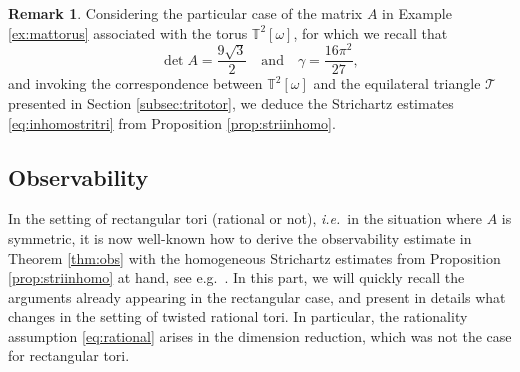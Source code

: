 \documentclass[a4paper,11pt]{amsart}
\numberwithin{equation}{section}
\theoremstyle{definition}
\newtheorem{rk}[thm]{Remark}
\begin{document}
\begin{rk}\label{rk:striinhomo} 
Considering the particular case of the matrix $A$ in Example \ref{ex:mattorus} associated with the torus $\mathbb T^2[\omega]$, for which we recall that 
\[
	\det A = \frac{9\sqrt{3}}{2}\quad\text{and}\quad \gamma = \frac{16\pi^2}{27},
\]
and invoking the correspondence between $\mathbb T^2[\omega]$ and the equilateral triangle $\mathcal T$ presented in Section \ref{subsec:tritotor}, we deduce the Strichartz estimates \eqref{eq:inhomostritri} from Proposition \ref{prop:striinhomo}.
\end{rk}

\subsection{Observability}

In the setting of rectangular tori (rational or not), \textit{i.e.}~in the situation where $A$ is symmetric, it is now well-known how to derive the observability estimate in Theorem \ref{thm:obs} with the homogeneous Strichartz estimates from Proposition \ref{prop:striinhomo} at hand, see e.g.~\cite{BZ,LBM}. In this part, we will quickly recall the arguments already appearing in the rectangular case, and present in details what changes in the setting of twisted rational tori. In particular, the rationality assumption \eqref{eq:rational} arises in the dimension reduction, which was not the case for rectangular tori.
\end{document}
